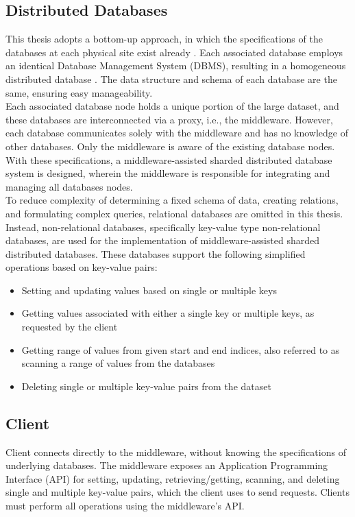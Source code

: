 \subsection{Distributed Databases}
This thesis adopts a bottom-up approach, in which the specifications of the databases at each physical site exist already \cite{ceri1987distributed}. Each associated database employs an identical Database Management System (DBMS), resulting in a homogeneous distributed database \cite{chamas2017comparing}. The data structure and schema of each database are the same, ensuring easy manageability. \\

\noindent Each associated database node holds a unique portion of the large dataset, and these databases are interconnected via a proxy, i.e., the middleware. However, each database communicates solely with the middleware and has no knowledge of other databases. Only the middleware is aware of the existing database nodes. With these specifications, a middleware-assisted sharded distributed database system is designed, wherein the middleware is responsible for integrating and managing all databases nodes. \\

\noindent To reduce complexity of determining a fixed schema of data, creating relations, and formulating complex queries, relational databases are omitted in this thesis. Instead, non-relational databases, specifically key-value type non-relational databases, are used for the implementation of middleware-assisted sharded distributed databases. These databases support the following simplified operations based on key-value pairs:
\begin{itemize}
\item[-]	Setting and updating values based on single or multiple keys
\item[-] 	Getting values associated with either a single key or multiple keys, as requested by the client
\item[-]	Getting range of values from given start and end indices, also referred to as scanning a range of values from the databases
\item[-]	Deleting single or multiple key-value pairs from the dataset
\end{itemize}



\subsection{Client}
Client connects directly to the middleware, without knowing the specifications of underlying databases. The middleware exposes an Application Programming Interface (API) for setting, updating, retrieving/getting, scanning, and deleting single and multiple key-value pairs, which the client uses to send requests. Clients must perform all operations using the middleware's API.

